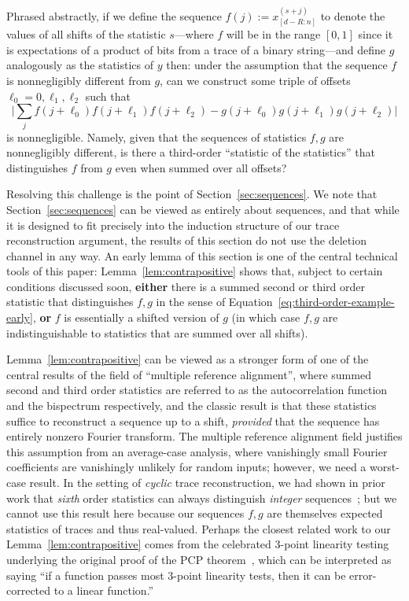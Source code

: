 \documentclass[11pt]{article}
\theoremstyle{plain}
\begin{document}
Phrased abstractly, if we define the sequence $f(j):=x^{(s+j)}_{[d-R:n]}$ to denote the values of all shifts of the statistic $s$---where $f$ will be in the range $[0,1]$ since it is expectations of a product of bits from a trace of a binary string---and define $g$ analogously as the statistics of $y$ then: under the assumption that the sequence $f$ is nonnegligibly different from $g$, can we construct some triple of offsets $\ell_0=0,\ell_1,\ell_2$ such that \begin{equation}\label{eq:third-order-example-early}\Big|\sum_j f(j+\ell_0)f(j+\ell_1)f(j+\ell_2)-g(j+\ell_0)g(j+\ell_1)g(j+\ell_2)\Big|\end{equation}
is nonnegligible. Namely, given that the sequences of statistics $f,g$ are nonnegligibly different, is there a third-order ``statistic of the statistics'' that distinguishes $f$ from $g$ even when summed over all offsets?

Resolving this challenge is the point of Section~\ref{sec:sequences}. We note that Section~\ref{sec:sequences} can be viewed as entirely about sequences, and that while it is designed to fit precisely into the induction structure of our trace reconstruction argument, the results of this section do not use the deletion channel in any way. An early lemma of this section is one of the central technical tools of this paper: Lemma~\ref{lem:contrapositive} shows that, subject to certain conditions discussed soon, \textbf{either} there is a summed second or third order statistic that distinguishes $f,g$ in the sense of Equation~\ref{eq:third-order-example-early}, \textbf{or} $f$ is essentially a shifted version of $g$ (in which case $f,g$ are indistinguishable to statistics that are summed over all shifts). 

Lemma~\ref{lem:contrapositive} can be viewed as a stronger form of one of the central results of the field of ``multiple reference alignment'', where summed second and third order statistics are referred to as the autocorrelation function and the bispectrum respectively, and the classic result is that these statistics suffice to reconstruct a sequence up to a shift, \emph{provided} that the sequence has entirely nonzero Fourier transform. The multiple reference alignment field justifies this assumption from an average-case analysis, where vanishingly small Fourier coefficients are vanishingly unlikely for random inputs; however, we need a worst-case result. 
In the setting of \emph{cyclic} trace reconstruction, we had shown in prior work that \emph{sixth} order statistics can always distinguish \emph{integer} sequences~\cite{burudgunte_et_al:LIPIcs.ITCS.2026.30}; but we cannot use this result here because our sequences $f,g$ are themselves expected statistics of traces and thus real-valued. Perhaps the closest related work to our Lemma~\ref{lem:contrapositive} comes from the celebrated 3-point linearity testing underlying the original proof of the PCP theorem~\cite{10.1145/100216.100225}, which can be interpreted as saying ``if a function passes most 3-point linearity tests, then it can be error-corrected to a linear function.''
\end{document}
